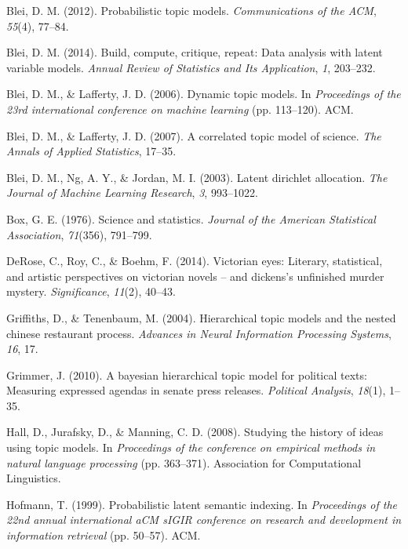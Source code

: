 \documentclass[12pt,]{article}
\begin{document}
\hypertarget{refs}{}
\hypertarget{ref-blei2012probabilistic}{}
Blei, D. M. (2012). Probabilistic topic models. \emph{Communications of
the ACM}, \emph{55}(4), 77--84.

\hypertarget{ref-blei2014build}{}
Blei, D. M. (2014). Build, compute, critique, repeat: Data analysis with
latent variable models. \emph{Annual Review of Statistics and Its
Application}, \emph{1}, 203--232.

\hypertarget{ref-blei2006dynamic}{}
Blei, D. M., \& Lafferty, J. D. (2006). Dynamic topic models. In
\emph{Proceedings of the 23rd international conference on machine
learning} (pp. 113--120). ACM.

\hypertarget{ref-blei2007correlated}{}
Blei, D. M., \& Lafferty, J. D. (2007). A correlated topic model of
science. \emph{The Annals of Applied Statistics}, 17--35.

\hypertarget{ref-blei2003latent}{}
Blei, D. M., Ng, A. Y., \& Jordan, M. I. (2003). Latent dirichlet
allocation. \emph{The Journal of Machine Learning Research}, \emph{3},
993--1022.

\hypertarget{ref-box1976science}{}
Box, G. E. (1976). Science and statistics. \emph{Journal of the American
Statistical Association}, \emph{71}(356), 791--799.

\hypertarget{ref-derose2014victorian}{}
DeRose, C., Roy, C., \& Boehm, F. (2014). Victorian eyes: Literary,
statistical, and artistic perspectives on victorian novels -- and
dickens's unfinished murder mystery. \emph{Significance}, \emph{11}(2),
40--43.

\hypertarget{ref-griffiths2004hierarchical}{}
Griffiths, D., \& Tenenbaum, M. (2004). Hierarchical topic models and
the nested chinese restaurant process. \emph{Advances in Neural
Information Processing Systems}, \emph{16}, 17.

\hypertarget{ref-grimmer2010bayesian}{}
Grimmer, J. (2010). A bayesian hierarchical topic model for political
texts: Measuring expressed agendas in senate press releases.
\emph{Political Analysis}, \emph{18}(1), 1--35.

\hypertarget{ref-hall2008studying}{}
Hall, D., Jurafsky, D., \& Manning, C. D. (2008). Studying the history
of ideas using topic models. In \emph{Proceedings of the conference on
empirical methods in natural language processing} (pp. 363--371).
Association for Computational Linguistics.

\hypertarget{ref-hofmann1999probabilistic}{}
Hofmann, T. (1999). Probabilistic latent semantic indexing. In
\emph{Proceedings of the 22nd annual international aCM sIGIR conference
on research and development in information retrieval} (pp. 50--57). ACM.
\end{document}
